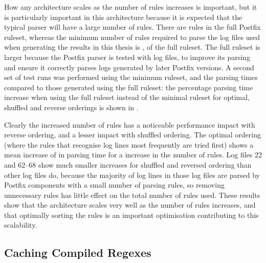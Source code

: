 \label{scalability as the number of rules rises}

How any architecture scales as the number of rules increases is important,
but it is particularly important in this architecture because it is
expected that the typical parser will have a large number of rules.  There
are \numberOFrules{} rules in the full Postfix ruleset, whereas the minimum
number of rules required to parse the \numberOFlogFILES{} log files used
when generating the results in this thesis is \numberOFrulesMINIMUM{},
\numberOFrulesMINIMUMpercentage{} of the full ruleset.  The full ruleset is
larger because the Postfix parser is tested with \numberOFlogFILESall{} log
files, to improve its parsing and ensure it correctly parses logs generated
by later Postfix versions.  A second set of test runs was performed using
the minimum ruleset, and the parsing times compared to those generated
using the full ruleset: the percentage parsing time increase when using the
full ruleset instead of the minimal ruleset for optimal, shuffled and
reverse orderings is shown in .


Clearly the increased number of rules has a noticeable performance impact
with reverse ordering, and a lesser impact with shuffled ordering.  The
optimal ordering (where the rules that recognise log lines most frequently
are tried first) shows a mean increase of
 in parsing time for a
\numberOFrulesMAXIMUMpercentage{} increase in the number of rules.  Log
files 22 and 62--68 show much smaller increases for shuffled and reversed
ordering than other log files do, because the majority of log lines in
those log files are parsed by Postfix components with a small number of
parsing rules, so removing unnecessary rules has little effect on the total
number of rules used.  These results show that the architecture scales very
well as the number of rules increases, and that optimally sorting the rules
is an important optimisation contributing to this scalability.

\subsection{Caching Compiled Regexes}

